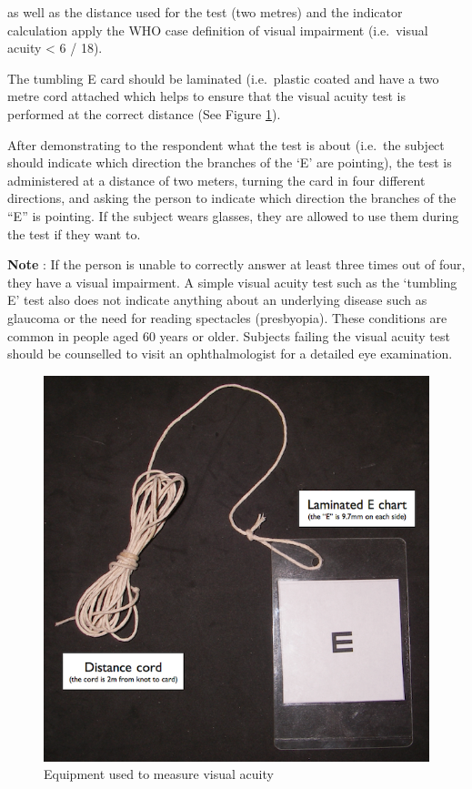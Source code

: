 \documentclass[12pt,a4paper]{book}
\theoremstyle{definition}
\theoremstyle{definition}
\theoremstyle{definition}
\theoremstyle{remark}
\begin{document}
as well as the distance used for the test (two metres) and the indicator
calculation apply the WHO case definition of visual impairment
(i.e.~visual acuity \textless{} 6 / 18).

The tumbling E card should be laminated (i.e.~plastic coated and have a
two metre cord attached which helps to ensure that the visual acuity
test is performed at the correct distance (See Figure
\ref{fig:indicators29}).

After demonstrating to the respondent what the test is about (i.e.~the
subject should indicate which direction the branches of the `E' are
pointing), the test is administered at a distance of two meters, turning
the card in four different directions, and asking the person to indicate
which direction the branches of the ``E'' is pointing. If the subject
wears glasses, they are allowed to use them during the test if they want
to.

\textbf{Note} : If the person is unable to correctly answer at least
three times out of four, they have a visual impairment. A simple visual
acuity test such as the `tumbling E' test also does not indicate
anything about an underlying disease such as glaucoma or the need for
reading spectacles (presbyopia). These conditions are common in people
aged 60 years or older. Subjects failing the visual acuity test should
be counselled to visit an ophthalmologist for a detailed eye
examination.

\newpage

\begin{figure}[H]

{\centering \includegraphics[width=8.33in]{figures/indicators29} 

}

\caption{Equipment used to measure visual acuity}\label{fig:indicators29}
\end{figure}\newpage
\end{document}
